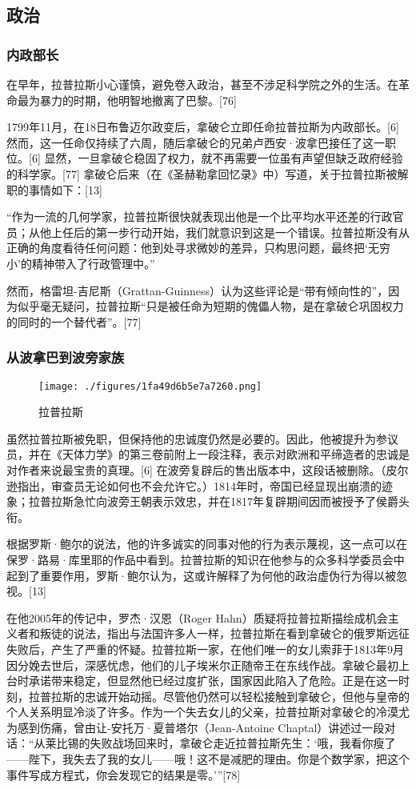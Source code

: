 \subsection{政治}  
\subsubsection{内政部长}  
在早年，拉普拉斯小心谨慎，避免卷入政治，甚至不涉足科学院之外的生活。在革命最为暴力的时期，他明智地撤离了巴黎。[76]

1799年11月，在18日布鲁迈尔政变后，拿破仑立即任命拉普拉斯为内政部长。[6] 然而，这一任命仅持续了六周，随后拿破仑的兄弟卢西安·波拿巴接任了这一职位。[6] 显然，一旦拿破仑稳固了权力，就不再需要一位虽有声望但缺乏政府经验的科学家。[77] 拿破仑后来（在《圣赫勒拿回忆录》中）写道，关于拉普拉斯被解职的事情如下：[13]

“作为一流的几何学家，拉普拉斯很快就表现出他是一个比平均水平还差的行政官员；从他上任后的第一步行动开始，我们就意识到这是一个错误。拉普拉斯没有从正确的角度看待任何问题：他到处寻求微妙的差异，只构思问题，最终把‘无穷小’的精神带入了行政管理中。”

然而，格雷坦-吉尼斯（Grattan-Guinness）认为这些评论是“带有倾向性的”，因为似乎毫无疑问，拉普拉斯“只是被任命为短期的傀儡人物，是在拿破仑巩固权力的同时的一个替代者”。[77]
\subsubsection{从波拿巴到波旁家族}
\begin{figure}[ht]
\centering
\texttt{[image: ./figures/1fa49d6b5e7a7260.png]}
\caption{拉普拉斯} \label{fig_LPLS_10}
\end{figure}
虽然拉普拉斯被免职，但保持他的忠诚度仍然是必要的。因此，他被提升为参议员，并在《天体力学》的第三卷前附上一段注释，表示对欧洲和平缔造者的忠诚是对作者来说最宝贵的真理。[6] 在波旁复辟后的售出版本中，这段话被删除。（皮尔逊指出，审查员无论如何也不会允许它。）1814年时，帝国已经显现出崩溃的迹象；拉普拉斯急忙向波旁王朝表示效忠，并在1817年复辟期间因而被授予了侯爵头衔。

根据罗斯·鲍尔的说法，他的许多诚实的同事对他的行为表示蔑视，这一点可以在保罗·路易·库里耶的作品中看到。拉普拉斯的知识在他参与的众多科学委员会中起到了重要作用，罗斯·鲍尔认为，这或许解释了为何他的政治虚伪行为得以被忽视。[13]

在他2005年的传记中，罗杰·汉恩（Roger Hahn）质疑将拉普拉斯描绘成机会主义者和叛徒的说法，指出与法国许多人一样，拉普拉斯在看到拿破仑的俄罗斯远征失败后，产生了严重的怀疑。拉普拉斯一家，在他们唯一的女儿索菲于1813年9月因分娩去世后，深感忧虑，他们的儿子埃米尔正随帝王在东线作战。拿破仑最初上台时承诺带来稳定，但显然他已经过度扩张，国家因此陷入了危险。正是在这一时刻，拉普拉斯的忠诚开始动摇。尽管他仍然可以轻松接触到拿破仑，但他与皇帝的个人关系明显冷淡了许多。作为一个失去女儿的父亲，拉普拉斯对拿破仑的冷漠尤为感到伤痛，曾由让-安托万·夏普塔尔（Jean-Antoine Chaptal）讲述过一段对话：“从莱比锡的失败战场回来时，拿破仑走近拉普拉斯先生：‘哦，我看你瘦了——陛下，我失去了我的女儿——哦！这不是减肥的理由。你是个数学家，把这个事件写成方程式，你会发现它的结果是零。’”[78]
